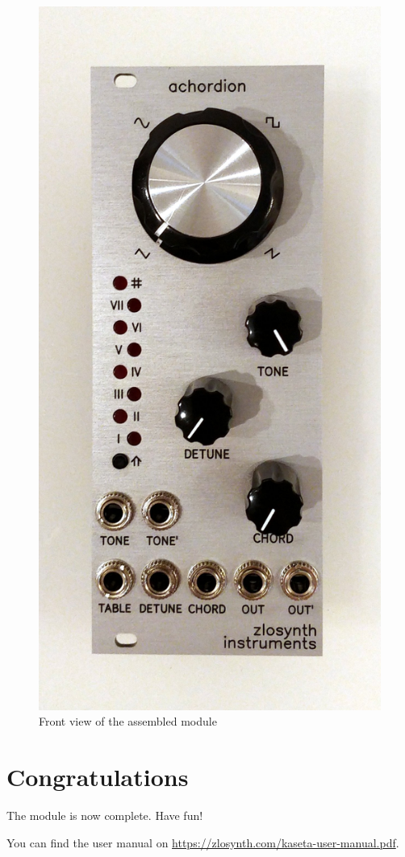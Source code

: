 \documentclass[10pt,a4paper,twocolumn]{article}
\begin{document}
\begin{figure}[p]
  \centering
  \includegraphics[width=\linewidth]{p08.jpg}
  \caption{Front view of the assembled module}
\end{figure}

\section{Congratulations}

The module is now complete. Have fun!

You can find the user manual on \url{https://zlosynth.com/kaseta-user-manual.pdf}.
\end{document}
